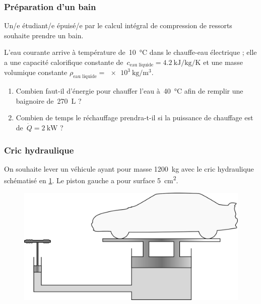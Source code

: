 \subsubsection{Préparation d’un bain}
\label{exo_bain}

	Un/e étudiant/e épuisé/e par le calcul intégral de compression de ressorts souhaite prendre un bain.
	
	L’eau courante arrive à température de~\SI{10}{\degreeCelsius} dans le chauffe-eau électrique ; elle a une capacité calorifique constante de~$c_{\text{eau liquide}} = \SI{4,2}{\kilo\joule\per\kilogram\per\kelvin}$ et une masse volumique constante $\rho_{\text{eau liquide}} = \SI{e3}{\kilogram\per\metre\cubed}$.
	
	\begin{enumerate}
		\item Combien faut-il d’énergie pour chauffer l’eau à~\SI{40}{\degreeCelsius} afin de remplir une baignoire de~\SI{270}{\liter} ?
		\item Combien de temps le réchauffage prendra-t-il si la puissance de chauffage est de~$\dot Q = \SI{+2}{\kilo\watt}$ ?
	\end{enumerate}



\subsubsection{Cric hydraulique}
\label{exo_cric}
\wherefrom{[DS n°1 2012, 5pts]}

	On souhaite lever un véhicule ayant pour masse \SI{1200}{\kilogram} avec le cric hydraulique schématisé en \cref{fig_cric}. Le piston gauche a pour surface \SI{5}{\centi\metre\squared}.	

	\begin{figure}
		\begin{center}
			\includegraphics[width=12cm]{images/cric.png}
		\end{center}
		\label{fig_cric}
	\end{figure}

